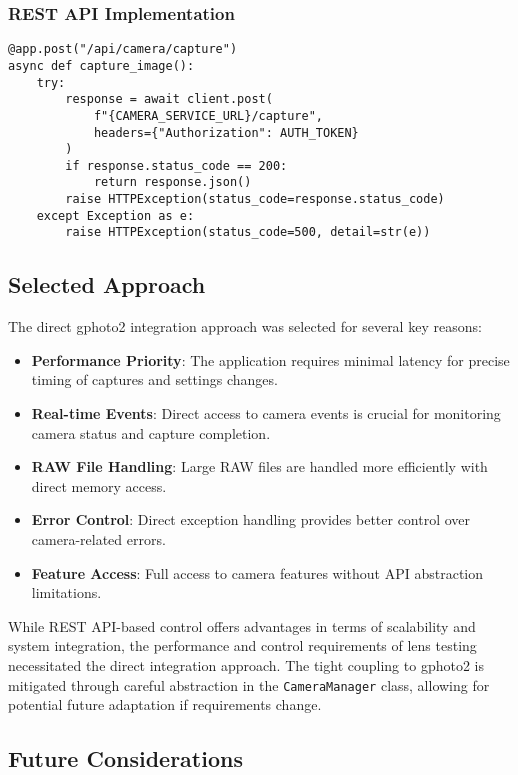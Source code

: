 \subsubsection{REST API Implementation}
\begin{verbatim}
@app.post("/api/camera/capture")
async def capture_image():
    try:
        response = await client.post(
            f"{CAMERA_SERVICE_URL}/capture",
            headers={"Authorization": AUTH_TOKEN}
        )
        if response.status_code == 200:
            return response.json()
        raise HTTPException(status_code=response.status_code)
    except Exception as e:
        raise HTTPException(status_code=500, detail=str(e))
\end{verbatim}

\subsection{Selected Approach}

The direct gphoto2 integration approach was selected for several key reasons:

\begin{itemize}
    \item \textbf{Performance Priority}: The application requires minimal latency for precise timing of captures and settings changes.
    \item \textbf{Real-time Events}: Direct access to camera events is crucial for monitoring camera status and capture completion.
    \item \textbf{RAW File Handling}: Large RAW files are handled more efficiently with direct memory access.
    \item \textbf{Error Control}: Direct exception handling provides better control over camera-related errors.
    \item \textbf{Feature Access}: Full access to camera features without API abstraction limitations.
\end{itemize}

While REST API-based control offers advantages in terms of scalability and system integration, the performance and control requirements of lens testing necessitated the direct integration approach. The tight coupling to gphoto2 is mitigated through careful abstraction in the \texttt{CameraManager} class, allowing for potential future adaptation if requirements change.

\subsection{Future Considerations}

